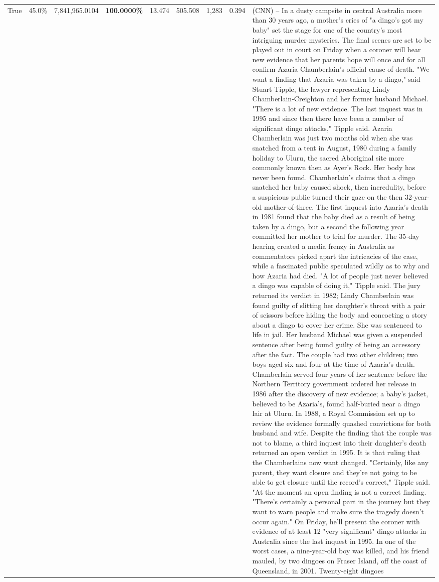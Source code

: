 \begin{table}[H]
\begin{tabular}{lllrlllll}
True & 45.0\% & 7,841,965.0104 & \bfseries \color{red} 100.0000\% & 13.474 & 505.508 & 1,283 & 0.394 & (CNN) -- In a dusty campsite in central Australia more than 30 years ago, a mother's cries of "a dingo's got my baby" set the stage for one of the country's most intriguing murder mysteries. The final scenes are set to be played out in court on Friday when a coroner will hear new evidence that her parents hope will once and for all confirm Azaria Chamberlain's official cause of death. "We want a finding that Azaria was taken by a dingo," said Stuart Tipple, the lawyer representing Lindy Chamberlain-Creighton and her former husband Michael. "There is a lot of new evidence. The last inquest was in 1995 and since then there have been a number of significant dingo attacks," Tipple said. Azaria Chamberlain was just two months old when she was snatched from a tent in August, 1980 during a family holiday to Uluru, the sacred Aboriginal site more commonly known then as Ayer's Rock. Her body has never been found. Chamberlain's claims that a dingo snatched her baby caused shock, then incredulity, before a suspicious public turned their gaze on the then 32-year-old mother-of-three. The first inquest into Azaria's death in 1981 found that the baby died as a result of being taken by a dingo, but a second the following year committed her mother to trial for murder. The 35-day hearing created a media frenzy in Australia as commentators picked apart the intricacies of the case, while a fascinated public speculated wildly as to why and how Azaria had died. "A lot of people just never believed a dingo was capable of doing it," Tipple said. The jury returned its verdict in 1982; Lindy Chamberlain was found guilty of slitting her daughter's throat with a pair of scissors before hiding the body and concocting a story about a dingo to cover her crime. She was sentenced to life in jail. Her husband Michael was given a suspended sentence after being found guilty of being an accessory after the fact. The couple had two other children; two boys aged six and four at the time of Azaria's death. Chamberlain served four years of her sentence before the Northern Territory government ordered her release in 1986 after the discovery of new evidence; a baby's jacket, believed to be Azaria's, found half-buried near a dingo lair at Uluru. In 1988, a Royal Commission set up to review the evidence formally quashed convictions for both husband and wife. Despite the finding that the couple was not to blame, a third inquest into their daughter's death returned an open verdict in 1995. It is that ruling that the Chamberlains now want changed. "Certainly, like any parent, they want closure and they're not going to be able to get closure until the record's correct," Tipple said. "At the moment an open finding is not a correct finding. "There's certainly a personal part in the journey but they want to warn people and make sure the tragedy doesn't occur again." On Friday, he'll present the coroner with evidence of at least 12 "very significant" dingo attacks in Australia since the last inquest in 1995. In one of the worst cases, a nine-year-old boy was killed, and his friend mauled, by two dingoes on Fraser Island, off the coast of Queensland, in 2001. Twenty-eight dingoes 
\end{tabular}
\end{table}
